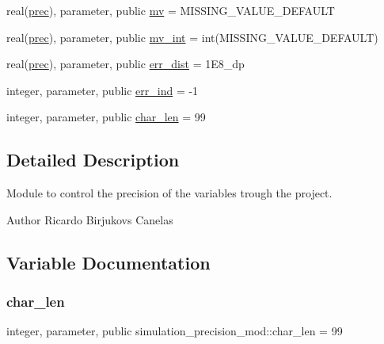 \begin{DoxyCompactItemize}
\item 
real(\hyperlink{namespacesimulation__precision__mod_aaff1ddf996761a1e11e787d63e1612f6}{prec}), parameter, public \hyperlink{namespacesimulation__precision__mod_a39845d8a0d331a7b9225feb5fe19ba3b}{mv} = M\+I\+S\+S\+I\+N\+G\+\_\+\+V\+A\+L\+U\+E\+\_\+\+D\+E\+F\+A\+U\+LT
\item 
real(\hyperlink{namespacesimulation__precision__mod_aaff1ddf996761a1e11e787d63e1612f6}{prec}), parameter, public \hyperlink{namespacesimulation__precision__mod_abcad51274c804cb573d8f5720c5dfa05}{mv\+\_\+int} = int(M\+I\+S\+S\+I\+N\+G\+\_\+\+V\+A\+L\+U\+E\+\_\+\+D\+E\+F\+A\+U\+LT)
\item 
real(\hyperlink{namespacesimulation__precision__mod_aaff1ddf996761a1e11e787d63e1612f6}{prec}), parameter, public \hyperlink{namespacesimulation__precision__mod_ae3222dd2d51f6b7221be1ca1c70e3e6c}{err\+\_\+dist} = 1\+E8\+\_\+dp
\item 
integer, parameter, public \hyperlink{namespacesimulation__precision__mod_a82a4b689dc26018c961193b991c489d4}{err\+\_\+ind} = -\/1
\item 
integer, parameter, public \hyperlink{namespacesimulation__precision__mod_a8a3305091ff953708508525398aa7129}{char\+\_\+len} = 99
\end{DoxyCompactItemize}


\subsection{Detailed Description}
Module to control the precision of the variables trough the project. 

\begin{DoxyAuthor}{Author}
Ricardo Birjukovs Canelas 
\end{DoxyAuthor}


\subsection{Variable Documentation}
\mbox{\label{namespacesimulation__precision__mod_a8a3305091ff953708508525398aa7129}} 
\subsubsection{\texorpdfstring{char\+\_\+len}{char\_len}}
{\footnotesize\ttfamily integer, parameter, public simulation\+\_\+precision\+\_\+mod\+::char\+\_\+len = 99}


